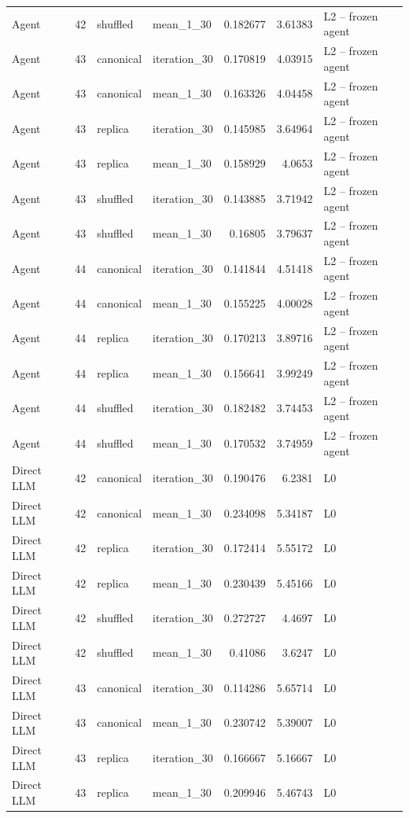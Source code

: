 \begin{table}[htbp!]
\begin{tabular}{lrllrrl}
Agent & 42 & shuffled & mean\_1\_30 & 0.182677 & 3.61383 & L2 -- frozen agent \\
Agent & 43 & canonical & iteration\_30 & 0.170819 & 4.03915 & L2 -- frozen agent \\
Agent & 43 & canonical & mean\_1\_30 & 0.163326 & 4.04458 & L2 -- frozen agent \\
Agent & 43 & replica & iteration\_30 & 0.145985 & 3.64964 & L2 -- frozen agent \\
Agent & 43 & replica & mean\_1\_30 & 0.158929 & 4.0653 & L2 -- frozen agent \\
Agent & 43 & shuffled & iteration\_30 & 0.143885 & 3.71942 & L2 -- frozen agent \\
Agent & 43 & shuffled & mean\_1\_30 & 0.16805 & 3.79637 & L2 -- frozen agent \\
Agent & 44 & canonical & iteration\_30 & 0.141844 & 4.51418 & L2 -- frozen agent \\
Agent & 44 & canonical & mean\_1\_30 & 0.155225 & 4.00028 & L2 -- frozen agent \\
Agent & 44 & replica & iteration\_30 & 0.170213 & 3.89716 & L2 -- frozen agent \\
Agent & 44 & replica & mean\_1\_30 & 0.156641 & 3.99249 & L2 -- frozen agent \\
Agent & 44 & shuffled & iteration\_30 & 0.182482 & 3.74453 & L2 -- frozen agent \\
Agent & 44 & shuffled & mean\_1\_30 & 0.170532 & 3.74959 & L2 -- frozen agent \\
Direct LLM & 42 & canonical & iteration\_30 & 0.190476 & 6.2381 & L0 \\
Direct LLM & 42 & canonical & mean\_1\_30 & 0.234098 & 5.34187 & L0 \\
Direct LLM & 42 & replica & iteration\_30 & 0.172414 & 5.55172 & L0 \\
Direct LLM & 42 & replica & mean\_1\_30 & 0.230439 & 5.45166 & L0 \\
Direct LLM & 42 & shuffled & iteration\_30 & 0.272727 & 4.4697 & L0 \\
Direct LLM & 42 & shuffled & mean\_1\_30 & 0.41086 & 3.6247 & L0 \\
Direct LLM & 43 & canonical & iteration\_30 & 0.114286 & 5.65714 & L0 \\
Direct LLM & 43 & canonical & mean\_1\_30 & 0.230742 & 5.39007 & L0 \\
Direct LLM & 43 & replica & iteration\_30 & 0.166667 & 5.16667 & L0 \\
Direct LLM & 43 & replica & mean\_1\_30 & 0.209946 & 5.46743 & L0 \\

\end{tabular}
\end{table}
